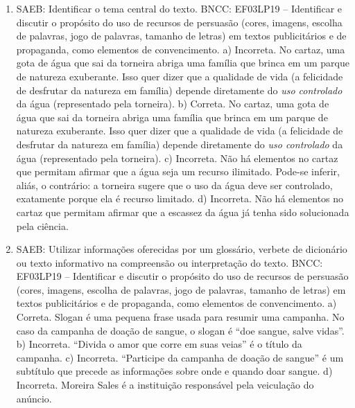 \begin{enumerate}
\item
SAEB: Identificar o tema central do texto.
BNCC: EF03LP19 -- Identificar e discutir o propósito do uso de recursos de
persuasão (cores, imagens, escolha de palavras, jogo de palavras,
tamanho de letras) em textos publicitários e de propaganda, como
elementos de convencimento.
a) Incorreta. No cartaz, uma gota de água que sai da torneira abriga uma 
família que brinca em um parque de natureza exuberante. Isso quer dizer 
que a qualidade de vida (a felicidade de desfrutar da natureza em família)
depende diretamente do \textit{uso controlado} da água (representado pela
torneira). 
b) Correta. No cartaz, uma gota de água que sai da torneira abriga uma 
família que brinca em um parque de natureza exuberante. Isso quer dizer 
que a qualidade de vida (a felicidade de desfrutar da natureza em família)
depende diretamente do \textit{uso controlado} da água (representado pela
torneira). 
c) Incorreta. Não há elementos no cartaz que permitam afirmar que a água 
seja um recurso ilimitado. Pode-se inferir, aliás, o contrário: a torneira
sugere que o uso da água deve ser controlado, exatamente porque ela é 
recurso limitado. 
d) Incorreta. Não há elementos no cartaz que permitam afirmar que a 
escassez da água já tenha sido solucionada pela ciência.

\item
SAEB: Utilizar informações oferecidas por um glossário, verbete de
dicionário ou texto informativo na compreensão ou interpretação do
texto.
BNCC: EF03LP19 -- Identificar e discutir o propósito do uso de recursos de
persuasão (cores, imagens, escolha de palavras, jogo de palavras,
tamanho de letras) em textos publicitários e de propaganda, como
elementos de convencimento.
a)  Correta. Slogan é uma pequena frase usada para resumir uma campanha.
No caso da campanha de doação de sangue, o slogan é ``doe sangue, salve
vidas''.
b)  Incorreta. ``Divida o amor que corre em suas veias'' é o título da
campanha.
c)  Incorreta. ``Participe da campanha de doação de sangue'' é um subtítulo
que precede as informações sobre onde e quando doar sangue.
d)  Incorreta. Moreira Sales é a instituição responsável pela veiculação
do anúncio.


\end{enumerate}
